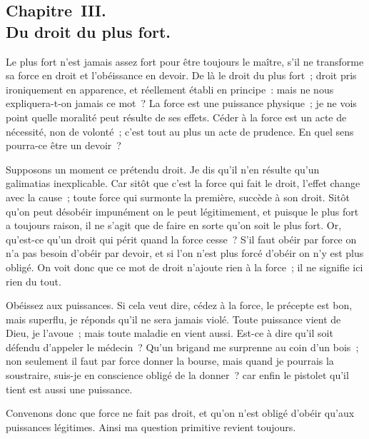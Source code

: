 \documentclass[french,twoside]{book} %
\begin{document}
\subsection[{Chapitre III. Du droit du plus fort.}]{Chapitre III. \\
Du droit du plus fort.}
\noindent Le plus fort n’est jamais assez fort pour être toujours le maître, s’il ne transforme sa force en droit et l’obéissance en devoir. De là le droit du plus fort ; droit pris ironiquement en apparence, et réellement établi en principe : mais ne nous expliquera-t-on jamais ce mot ? La force est une puissance physique ; je ne vois point quelle moralité peut résulte de ses effets. Céder à la force est un acte de nécessité, non de volonté ; c’est tout au plus un acte de prudence. En quel sens pourra-ce être un devoir ?\par
Supposons un moment ce prétendu droit. Je dis qu’il n’en résulte qu’un galimatias inexplicable. Car sitôt que c’est la force qui fait le droit, l’effet change avec la cause ; toute force qui surmonte la première, succède à son droit. Sitôt qu’on peut désobéir impunément on le peut légitimement, et puisque le plus fort a toujours raison, il ne s’agit que de faire en sorte qu’on soit le plus fort. Or, qu’est-ce qu’un droit qui périt quand la force cesse ? S’il faut obéir par force on n’a pas besoin d’obéir par devoir, et si l’on n’est plus forcé d’obéir on n’y est plus obligé. On voit donc que ce mot de droit n’ajoute rien à la force ; il ne signifie ici rien du tout.\par
Obéissez aux puissances. Si cela veut dire, cédez à la force, le précepte est bon, mais superflu, je réponds qu’il ne sera jamais violé. Toute puissance vient de Dieu, je l’avoue ; mais toute maladie en vient aussi. Est-ce à dire qu’il soit défendu d’appeler le médecin ? Qu’un brigand me surprenne au coin d’un bois ; non seulement il faut par force donner la bourse, mais quand je pourrais la soustraire, suis-je en conscience obligé de la donner ? car enfin le pistolet qu’il tient est aussi une puissance.\par
Convenons donc que force ne fait pas droit, et qu’on n’est obligé d’obéir qu’aux puissances légitimes. Ainsi ma question primitive revient toujours.
\end{document}
